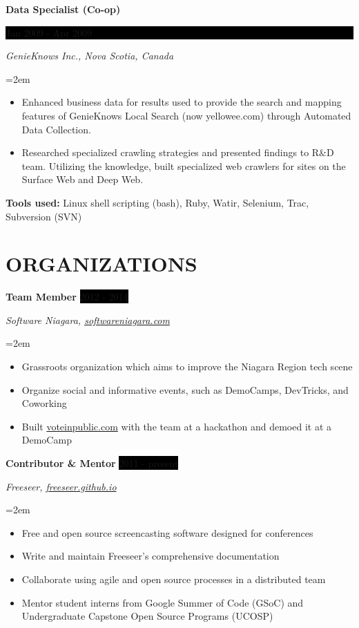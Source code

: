 \documentclass[paper=a4,fontsize=11pt]{scrartcl} %
\newcommand{\sepspace}{\vspace*{1em}}   %
\newcommand{\NewPart}[1]{\section*{\uppercase{#1}}}
\newcommand{\EducationEntry}[4]{
    \noindent \textbf{#1} \hfill      %
    \colorbox{Black}{
      \parbox{8.5em}{
      \hfill\color{White}#2}} \par  %
    \noindent \textit{#3} \par        %
    \noindent\hangindent=2em\hangafter=0 \small #4 %
    \normalsize \par}
\newcommand{\WorkEntry}[4]{       %
    \noindent \textbf{#1} \hfill      %
    \colorbox{Black}{%
      \parbox{9em}{%
      \hfill\color{White}#2}} \par   %
        \noindent \textit{#3} \par        %
    \noindent\hangindent=2em\hangafter=0 \small #4 %
    \normalsize \par}
\newcommand{\OrganizationEntry}[4]{         %
    \noindent \textbf{#1} \hfill            %
    \colorbox{Black}{\color{White}#2} \par  %
    \noindent \textit{#3} \par              %
    \noindent\hangindent=2em\hangafter=0 \small #4 %
    \normalsize \par}
\begin{document}
\WorkEntry{Data Specialist (Co-op)}{Jan 2009 - Apr 2009}
{GenieKnows Inc., Nova Scotia, Canada}
{
 \begin{itemize} \itemsep -1pt
   \item Enhanced business data for results used to provide the search
   and mapping features of GenieKnows Local Search (now yellowee.com)
   through Automated Data Collection.
   \item Researched specialized crawling strategies and presented findings
   to R\&D team. Utilizing the knowledge, built specialized web crawlers
   for sites on the Surface Web and Deep Web.
 \end{itemize}
 \textbf{Tools used:} Linux shell scripting (bash), Ruby, Watir, Selenium, Trac, Subversion (SVN)
}

\NewPart{Organizations}{}


\OrganizationEntry{Team Member}{2012 - 2014}
{Software Niagara, \url{softwareniagara.com}}
{
 \begin{itemize} \itemsep -1pt
   \item Grassroots organization which aims to improve the Niagara Region tech scene
   \item Organize social and informative events, such as DemoCamps, DevTricks, and Coworking
   \item Built \url{voteinpublic.com} with the team at a hackathon and demoed it at a DemoCamp
 \end{itemize}
}
\sepspace

\OrganizationEntry{Contributor \& Mentor}{2011 - present}
{Freeseer, \url{freeseer.github.io}}
{
 \begin{itemize} \itemsep -1pt %
   \item Free and open source screencasting software designed for conferences
   \item Write and maintain Freeseer's comprehensive documentation
   \item Collaborate using agile and open source processes in a distributed team
   \item Mentor student interns from Google Summer of Code (GSoC) and Undergraduate Capstone Open Source Programs (UCOSP)
 \end{itemize}
}
\sepspace
\end{document}
